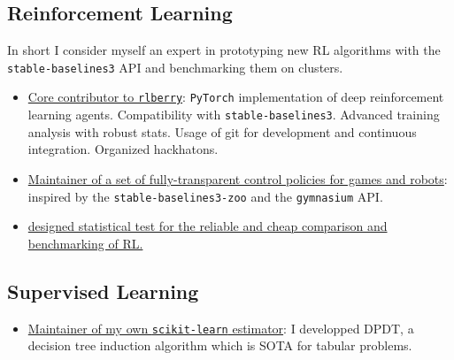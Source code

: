 \subsection*{Reinforcement Learning}
In short I consider myself an expert in prototyping new RL algorithms with the \texttt{stable-baselines3} API and benchmarking them on clusters.
\begin{itemize}
    \item[] \href{https://rlberry-py.github.io/rlberry/about.html#contributors}{Core contributor to \texttt{rlberry}}: \texttt{PyTorch} implementation of deep reinforcement learning agents. Compatibility with \texttt{stable-baselines3}. Advanced training analysis with robust stats. Usage of git for development and continuous integration. Organized hackhatons.
    \item[] \href{https://github.com/KohlerHECTOR/interpretable-rl-zoo}{Maintainer of a set of fully-transparent control policies for games and robots}: inspired by the \texttt{stable-baselines3-zoo} and the \texttt{gymnasium} API.
    \item[] \href{https://github.com/TimotheeMathieu/adastop}{designed statistical test for the reliable and cheap comparison and benchmarking of RL.}
\end{itemize}


\subsection*{Supervised Learning}

\begin{itemize}
    \item[] \href{https://github.com/KohlerHECTOR/DPDTreeEstimator}{Maintainer of my own \texttt{scikit-learn} estimator}: I developped DPDT, a decision tree induction algorithm which is SOTA for tabular problems. 
\end{itemize}

